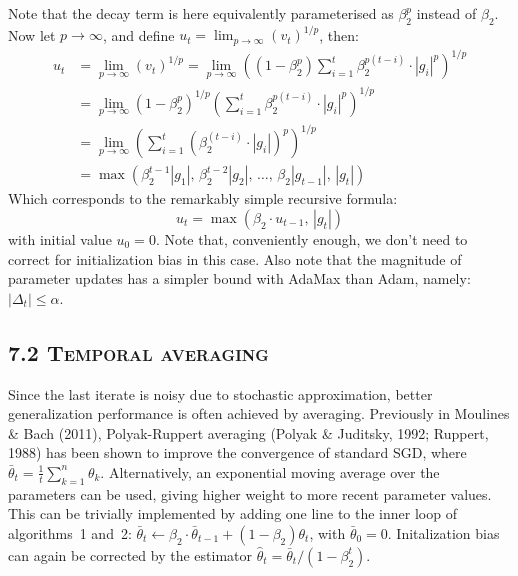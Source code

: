 \documentclass[11pt]{article}
\begin{document}
\vspace{1em}

\noindent
Note that the decay term is here equivalently parameterised as
$\beta_2^p$ instead of $\beta_2$. Now let $p \to \infty$, and
define $u_t = \lim_{p \to \infty}(v_t)^{1/p}$, then:
%
\begin{align}
u_t &= \lim_{p \to \infty}(v_t)^{1/p}
     = \lim_{p \to \infty}\!\left((1 - \beta_2^p) \sum_{i=1}^{t} \beta_2^{p(t-i)} \cdot |g_i|^p\right)^{\!1/p} \\
    &= \lim_{p \to \infty}(1 - \beta_2^p)^{1/p}
       \left(\sum_{i=1}^{t} \beta_2^{p(t-i)} \cdot |g_i|^p\right)^{\!1/p} \\
    &= \lim_{p \to \infty}\!\left(\sum_{i=1}^{t} \left(\beta_2^{(t-i)} \cdot |g_i|\right)^{p}\right)^{\!1/p} \\
    &= \max\!\left(\beta_2^{t-1}|g_1|,\, \beta_2^{t-2}|g_2|,\, \ldots,\, \beta_2 |g_{t-1}|,\, |g_t|\right)
\end{align}
%
Which corresponds to the remarkably simple recursive formula:
%
\begin{equation}
u_t = \max(\beta_2 \cdot u_{t-1},\, |g_t|)
\end{equation}
%
with initial value $u_0 = 0$. Note that, conveniently enough, we
don't need to correct for initialization bias in this case. Also
note that the magnitude of parameter updates has a simpler bound
with AdaMax than Adam, namely: $|\Delta_t| \leq \alpha$.

\vspace{0.5em}

\subsection*{7.2 \textsc{Temporal averaging}}

Since the last iterate is noisy due to stochastic approximation,
better generalization performance is often achieved by
averaging. Previously in Moulines \& Bach (2011), Polyak-Ruppert
averaging (Polyak \& Juditsky, 1992; Ruppert, 1988) has been
shown to improve the convergence of standard SGD, where
$\bar{\theta}_t = \frac{1}{t} \sum_{k=1}^{n} \theta_k$.
Alternatively, an exponential moving average over the parameters
can be used, giving higher weight to more recent parameter
values. This can be trivially implemented by adding one line to
the inner loop of algorithms~1 and~2:
$\bar{\theta}_t \leftarrow \beta_2 \cdot \bar{\theta}_{t-1} + (1 - \beta_2) \theta_t$,
with $\bar{\theta}_0 = 0$. Initalization bias can again be
corrected by the estimator
$\widehat{\theta}_t = \bar{\theta}_t / (1 - \beta_2^t)$.
\end{document}
